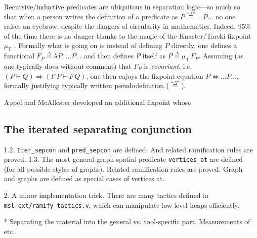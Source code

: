 Recursive/inductive predicates are ubiquitous in separation logic---so much so that when a person writes the definition of a
predicate as $P \stackrel{\textrm{``}\Delta\textrm{''}}{=} \ldots P \ldots$ no one raises an eyebrow, despite the dangers of circularity in
mathematics.  Indeed, 95\% of the time there is no danger thanks to the magic of the Knaster/Tarski fixpoint $\mu_{\mathsf{T}}$ \cite{tarski:fixpoint}.
Formally what is going on is instead of defining $P$ directly, one defines a functional
$F_P \stackrel{\Delta}{=} \lambda P.~ \ldots P \ldots$ and then defines $P$ itself as $P \stackrel{\Delta}{=} \mu_{\mathsf{T}} \, F_P$.
Assuming (as one typically does without comment) that $F_P$ is \emph{covariant}, i.e. $(P \vdash Q) \Rightarrow (F \, P \vdash F \, Q)$,
one then enjoys the fixpoint equation
$P \Leftrightarrow \ldots P \ldots$, formally justifying typically written pseudodefinition ($\stackrel{\textrm{``}\Delta\textrm{''}}{=}$).





Appel and McAllester developed an additional fixpoint \cite{appel:fixpoint} whose \cite{appel:vmm}

\subsection{The iterated separating conjunction}
1.2. \texttt{Iter\_sepcon} and \texttt{pred\_sepcon} are defined. And related ramification rules are proved.
1.3. The most general graph-spatial-predicate \texttt{vertices\_at} are defined (for all possible styles of graphs). Related ramification rules are proved. Graph and graphs are defined as special cases of vertices at.

2. A minor implementation trick. There are many tactics defined in \texttt{msl\_ext/ramify\_tactics.v}, which can manipulate low level heaps efficiently.

* Separating the material into the general vs. tool-specific part.  Measurements of etc.
